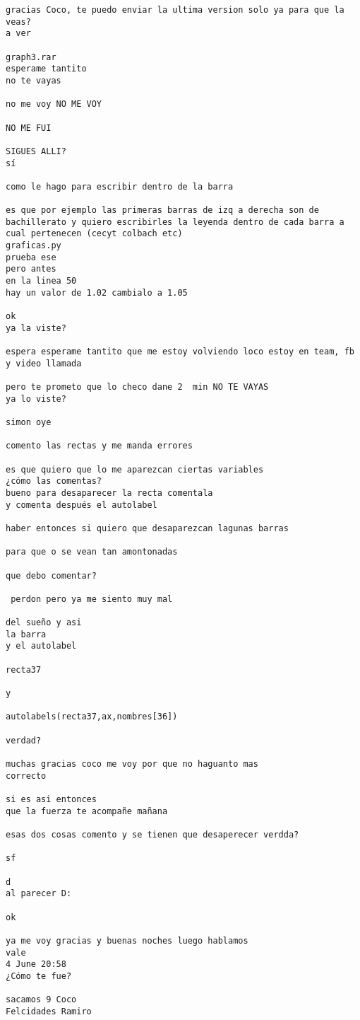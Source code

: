 \begin{verbatim}
gracias Coco, te puedo enviar la ultima version solo ya para que la veas?
a ver

graph3.rar
esperame tantito
no te vayas

no me voy NO ME VOY

NO ME FUI

SIGUES ALLI?
sí

como le hago para escribir dentro de la barra

es que por ejemplo las primeras barras de izq a derecha son de bachillerato y quiero escribirles la leyenda dentro de cada barra a cual pertenecen (cecyt colbach etc)
graficas.py
prueba ese
pero antes
en la linea 50
hay un valor de 1.02 cambialo a 1.05

ok
ya la viste?

espera esperame tantito que me estoy volviendo loco estoy en team, fb y video llamada

pero te prometo que lo checo dane 2  min NO TE VAYAS
ya lo viste?

simon oye

comento las rectas y me manda errores

es que quiero que lo me aparezcan ciertas variables
¿cómo las comentas?
bueno para desaparecer la recta comentala
y comenta después el autolabel

haber entonces si quiero que desaparezcan lagunas barras

para que o se vean tan amontonadas

que debo comentar?

 perdon pero ya me siento muy mal

del sueño y asi
la barra
y el autolabel

recta37

y

autolabels(recta37,ax,nombres[36])

verdad?

muchas gracias coco me voy por que no haguanto mas
correcto

si es asi entonces
que la fuerza te acompañe mañana 

esas dos cosas comento y se tienen que desaperecer verdda?

sf

d
al parecer D:

ok

ya me voy gracias y buenas noches luego hablamos
vale
4 June 20:58
¿Cómo te fue?

sacamos 9 Coco 
Felcidades Ramiro 


\end{verbatim}
